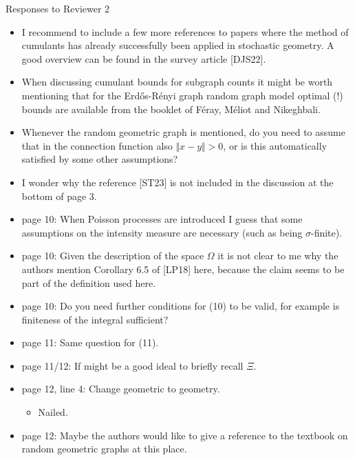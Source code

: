 \documentclass[11pt]{article}
\let\Horig\H
\def\H{{\mathord{\mathbb H}}}
\begin{document}
\newpage

\begin{center} 
\large{Responses to Reviewer 2} %
\\ 
\end{center}

\noindent 


\begin{itemize}
  \item 
 I recommend to include a few more references to papers where the method of cumulants has already successfully been applied in stochastic geometry. A good overview can be found in the survey article [DJS22].
\item  When discussing cumulant bounds for subgraph counts it might be worth mentioning that for the
 Erd{\Horig o}s-R\'enyi graph 
 random graph model optimal (!) bounds are available from the booklet of Féray, Méliot and Nikeghbali.
\item  Whenever the random geometric graph is mentioned, do you need to assume that in the connection function also
  $\Vert x - y \Vert> 0$,
  or is this automatically satisfied by some other assumptions?
      \item I wonder why the reference [ST23] is not included in the discussion at the bottom of page 3.
  \item  page 10: When Poisson processes are introduced I guess that some assumptions on the intensity measure are necessary (such as being $\sigma$-finite).
  \item  page 10: Given the description of the space $\Omega$ it is not clear to me why the authors mention Corollary 6.5 of [LP18] here, because the claim seems to be part of the definition used here.
  \item  page 10: Do you need further conditions for (10) to be valid, for example is finiteness of the integral sufficient?
  \item  page 11: Same question for (11).
  \item  page 11/12: If might be a good ideal to briefly recall $\Xi$.
  \item  page 12, line 4: Change geometric to geometry.
  \begin{itemize}
    \item Nailed. 
  \end{itemize}
  \item  page 12: Maybe the authors would like to give a reference to the textbook on random geometric graphs at this place.

\end{itemize}
\end{document}
